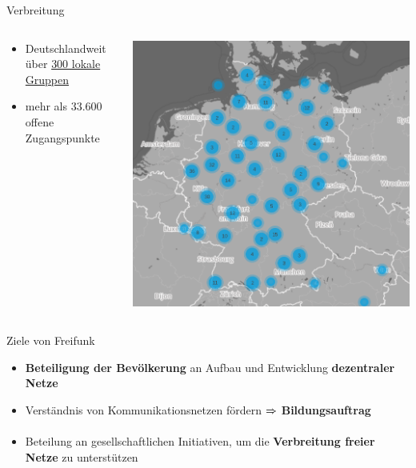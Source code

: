\documentclass[t]{beamer}
\begin{document}
  \begin{frame}{Verbreitung}
    \begin{columns}
      \begin{column}{0.6\textwidth}
        \begin{itemize}
          \item Deutschlandweit über  \href{http://freifunk.net/wie-mache-ich-mit/community-finden/}{300 lokale Gruppen}
          \item mehr als 33.600 offene Zugangspunkte

        \end{itemize}
      \end{column}
      \begin{column}{0.4\textwidth}
        \begin{center}
          \includegraphics[width=\textwidth]{images/2016-06-01_map-de}
        \end{center}
      \end{column}
    \end{columns}
  \end{frame}

  \begin{frame}{Ziele von Freifunk}
    \begin{itemize}
      \item \textbf{Beteiligung der Bevölkerung} an Aufbau und Entwicklung \textbf{dezentraler Netze}
      \item Verständnis von Kommunikationsnetzen fördern $\xRightarrow{}$ \textbf{Bildungsauftrag}
      \item Beteilung an gesellschaftlichen Initiativen, um die \textbf{Verbreitung freier Netze} zu unterstützen
    \end{itemize}
  \end{frame}
\end{document}
